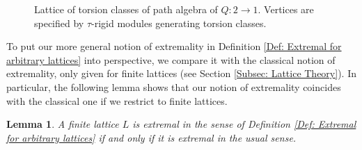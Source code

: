 \documentclass{amsart}
\theoremstyle{thmstyle}
\newtheorem{lemma}[thm]{Lemma}
\theoremstyle{exstyle}
\theoremstyle{defstyle}
\theoremstyle{remstyle}
\theoremstyle{remstyle}
\begin{document}
\begin{figure}[h]
\begin{center}
\end{center}
\caption{Lattice of torsion classes of path algebra of $Q: 2\to 1$. Vertices are specified by $\tau$-rigid modules generating torsion classes.}\label{Fig. for A_2}
\end{figure}

To put our more general notion of extremality in Definition \ref{Def: Extremal for arbitrary lattices} into perspective, we compare it with the classical notion of extremality, only given for finite lattices (see Section \ref{Subsec: Lattice Theory}). 
In particular, the following lemma shows that our notion of extremality coincides with the classical one if we restrict to finite lattices. 

\begin{lemma}\label{Lem: generalized extremal for finite lattices} 
A finite lattice $L$ is extremal in the sense of Definition \ref{Def: Extremal for arbitrary lattices} if and only if it is extremal in the usual sense. \end{lemma}
\end{document}
